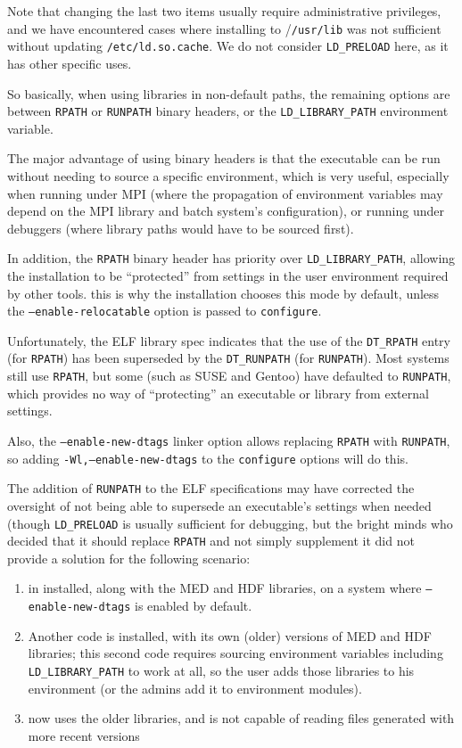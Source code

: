 \documentclass[a4paper,10pt,twoside]{csshortdoc}
\begin{document}
Note that changing the last two items usually require administrative privileges,
and we have encountered cases where installing to /\texttt{/usr/lib} was not
sufficient without updating \texttt{/etc/ld.so.cache}. We do not consider
\texttt{LD\_PRELOAD} here, as it has other specific uses.

So basically, when using libraries in non-default paths, the remaining
options are between \texttt{RPATH} or \texttt{RUNPATH} binary headers, or the
\texttt{LD\_LIBRARY\_PATH} environment variable.

The major advantage of using binary headers is that the executable
can be run without needing to source a specific environment, which
is very useful, especially when running under MPI (where the propagation
of environment variables may depend on the MPI library and batch system's
configuration), or running under debuggers (where library paths would have
to be sourced first).

In addition, the \texttt{RPATH} binary header has priority over
\texttt{LD\_LIBRARY\_PATH}, allowing the installation to be ``protected''
from settings in the user environment required by other tools.
this is why the \CS installation chooses this mode by default,
unless the \texttt{--enable-relocatable} option is passed to
{\tt configure}.

Unfortunately, the ELF library spec indicates that the use of the
\texttt{DT\_RPATH} entry (for \texttt{RPATH}) has been superseded by the
\texttt{DT\_RUNPATH} (for \texttt{RUNPATH}). Most systems still use
\texttt{RPATH}, but some (such as SUSE and Gentoo) have defaulted to
\texttt{RUNPATH}, which provides no way of ``protecting'' an executable
or library from external settings.

Also, the \texttt{--enable-new-dtags} linker option allows replacing
\texttt{RPATH} with \texttt{RUNPATH}, so adding \texttt{-Wl,--enable-new-dtags}
to the {\tt configure} options will do this.

The addition of \texttt{RUNPATH} to the ELF specifications may have
corrected the oversight of not being able to supersede an executable's
settings when needed (though \texttt{LD\_PRELOAD} is usually sufficient
for debugging, but the bright minds who decided that it should
replace \texttt{RPATH} and not simply supplement it did not provide
a solution for the following scenario:

\begin{enumerate}
\item \CS in installed, along with the MED and HDF libraries,
       on a system where \texttt{--enable-new-dtags} is enabled by default.
\item Another code is installed, with its own (older) versions of MED and HDF
      libraries; this second code requires sourcing environment variables
      including \texttt{LD\_LIBRARY\_PATH} to work at all, so the user
      adds those libraries to his environment (or the admins add it to
      environment modules).
\item \CS now uses the older libraries, and is not capable of reading
      files generated with more recent versions
\end{enumerate}
\end{document}
